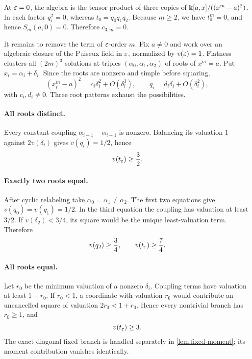 \documentclass[11pt]{article}
\theoremstyle{definition}
\theoremstyle{remark}
\begin{document}
At \(\varepsilon=0\), the algebra is the tensor product of three copies of
\(\Bbbk[a,x]/((x^m-a)^2)\).  In each factor \(q_i^2=0\), whereas
\(t_0=q_0q_1q_2\).  Because \(m\ge2\), we have \(t_0^m=0\), and hence
\(S_m(a,0)=0\).  Therefore \(c_{3,m}=0\).

It remains to remove the term of \(\varepsilon\)-order \(m\).  Fix \(a\ne0\) and
work over an algebraic closure of the Puiseux field in \(\varepsilon\), normalized
by \(v(\varepsilon)=1\).  Flatness clusters all \((2m)^3\) solutions at triples
\((\alpha_0,\alpha_1,\alpha_2)\) of roots of \(x^m=a\).  Put
\(x_i=\alpha_i+\delta_i\).  Since the roots are nonzero and simple before
squaring,
\[
(x_i^m-a)^2=c_i\delta_i^2+O(\delta_i^3),
\qquad
q_i=d_i\delta_i+O(\delta_i^2),
\]
with \(c_i,d_i\ne0\).  Three root patterns exhaust the possibilities.

\paragraph{All roots distinct.}
Every constant coupling \(\alpha_{i-1}-\alpha_{i+1}\) is nonzero.  Balancing
its valuation \(1\) against \(2v(\delta_i)\) gives
\(v(q_i)=1/2\), hence
\begin{equation}
v(t_\varepsilon)\ge\frac32.
\label{eq:valuation-distinct}
\end{equation}

\paragraph{Exactly two roots equal.}
After cyclic relabeling take \(\alpha_0=\alpha_1\ne\alpha_2\).  The first
two equations give \(v(q_0)=v(q_1)=1/2\).  In the third equation the coupling
has valuation at least \(3/2\).  If \(v(\delta_2)<3/4\), its square would be
the unique least-valuation term.  Therefore
\begin{equation}
v(q_2)\ge\frac34,
\qquad
v(t_\varepsilon)\ge\frac74.
\label{eq:valuation-twoequal}
\end{equation}

\paragraph{All roots equal.}
Let \(r_0\) be the minimum valuation of a nonzero \(\delta_i\).  Coupling
terms have valuation at least \(1+r_0\).  If \(r_0<1\), a coordinate with
valuation \(r_0\) would contribute an uncancelled square of valuation
\(2r_0<1+r_0\).  Hence every nontrivial branch has \(r_0\ge1\), and
\begin{equation}
v(t_\varepsilon)\ge3.
\label{eq:valuation-allequal}
\end{equation}
The exact diagonal fixed branch is handled separately in
\cref{lem:fixed-moment}; its moment contribution vanishes identically.
\end{document}

